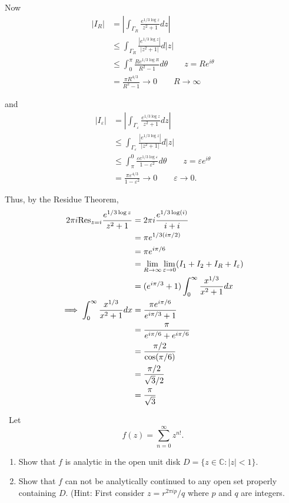 \documentclass[12pt]{Qual}
\begin{document}
\begin{solution}
Now \begin{align*}
    |I_R|&=\left|\int_{\Gamma_R}\frac{e^{1/3\log z}}{z^2+1}dz\right|\\
    &\le \int_{\Gamma_R}\frac{|e^{1/3\log z}|}{|z^2+1|}d|z|\\
    &\le \int_0^\pi\frac{Re^{1/3\log R}}{R^2-1}d\theta\qquad z=Re^{i\theta}\\
    &=\frac{\pi R^{4/3}}{R^2-1}\to0\qquad R\to\infty
\end{align*}

and \begin{align*}
    |I_\varepsilon|&=\left|\int_{\Gamma_\varepsilon}\frac{e^{1/3\log z}}{z^2+1}dz\right|\\
    &\le \int_{\Gamma_\varepsilon}\frac{|e^{1/3\log z}|}{|z^2+1|}d|z|\\
    &\le \int_\pi^0\frac{\varepsilon e^{1/3\log \varepsilon}}{1-\varepsilon^2}d\theta\qquad z=\varepsilon e^{i\theta}\\
    &=\frac{\pi \varepsilon^{4/3}}{1-\varepsilon^2}\to0\qquad \varepsilon\to0.
\end{align*}

Thus, by the Residue Theorem, \begin{align*}
    2\pi i\text{Res}_{z=i}\frac{e^{1/3\log z}}{z^2+1}&=2\pi i\frac{e^{1/3\log (i)}}{i+i}\\
    &=\pi e^{1/3(i\pi/2)}\\
    &=\pi e^{i\pi/6}\\
    &=\lim_{R\to\infty}\lim_{\varepsilon\to0}(I_1+I_2+I_R+I_\varepsilon)\\
    &=(e^{i\pi/3}+1)\int_0^\infty\frac{x^{1/3}}{x^2+1}dx\\
    \implies \int_0^\infty\frac{x^{1/3}}{x^2+1}dx&=\frac{\pi e^{i\pi/6}}{e^{i\pi/3}+1}\\
    &=\frac{\pi}{e^{i\pi/6}+e^{i\pi/6}}\\
    &=\frac{\pi/2}{\cos(\pi/6)}\\
    &=\frac{\pi/2}{\sqrt{3}/2}\\
    &=\frac{\pi}{\sqrt{3}}
\end{align*}
\end{solution}
\newpage



\begin{problem} $\,$
Let $$f(z)=\sum_{n=0}^\infty z^{n!}.$$
\begin{enumerate}[label=(\alph*)]
    \item Show that $f$ is analytic in the open unit disk $D=\{z\in\mathbb{C}:|z|<1\}.$
    \item Show that $f$ can not be analytically continued to any open set properly containing $D.$ (Hint: First consider $z=r^{2\pi ip}/q$ where $p$ and $q$ are integers.
\end{enumerate}
\end{problem}
\end{document}
